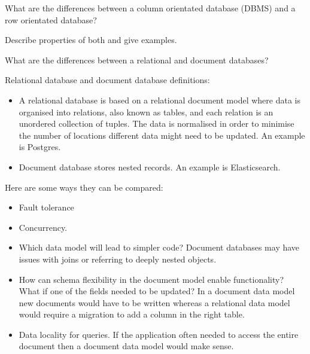 \begin{questions}

\question What are the differences between a column orientated database (DBMS) and a row orientated database?
\begin{solution}
Describe properties of both and give examples.
\end{solution}

\question What are the differences between a relational and document databases?
\begin{solution}
Relational database and document database definitions:
\begin{itemize}
    \item A relational database is based on a relational document model where data is organised into relations, also known as tables, and each relation is an unordered collection of tuples. The data is normalised in order to minimise the number of locations different data might need to be updated. An example is Postgres.
    \item Document database stores nested records. An example is Elasticsearch.
\end{itemize}
Here are some ways they can be compared:
\begin{itemize}
    \item Fault tolerance
    \item Concurrency. 
    \item Which data model will lead to simpler code? Document databases may have issues with joins or referring to deeply nested objects.
    \item How can schema flexibility in the document model enable functionality? What if one of the fields needed to be updated? In a document data model new documents would have to be written whereas a relational data model would require a migration to add a column in the right table.
    \item Data locality for queries. If the application often needed to access the entire document then a document data model would make sense.
\end{itemize}
\cite[p.~38]{ddia}
\end{solution}


\end{questions}
